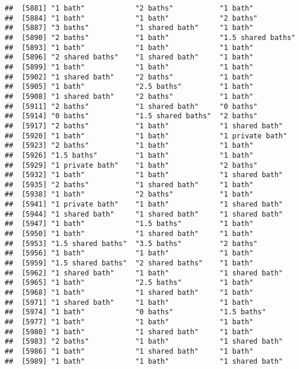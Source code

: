 \documentclass[
]{article}
\begin{document}
\begin{verbatim}
##  [5881] "1 bath"            "2 baths"           "1 bath"           
##  [5884] "1 bath"            "1 bath"            "2 baths"          
##  [5887] "3 baths"           "1 shared bath"     "1 bath"           
##  [5890] "2 baths"           "1 bath"            "1.5 shared baths" 
##  [5893] "1 bath"            "1 bath"            "1 bath"           
##  [5896] "2 shared baths"    "1 shared bath"     "1 bath"           
##  [5899] "1 bath"            "1 bath"            "1 bath"           
##  [5902] "1 shared bath"     "2 baths"           "1 bath"           
##  [5905] "1 bath"            "2.5 baths"         "1 bath"           
##  [5908] "1 shared bath"     "2 baths"           "1 bath"           
##  [5911] "2 baths"           "1 shared bath"     "0 baths"          
##  [5914] "0 baths"           "1.5 shared baths"  "2 baths"          
##  [5917] "2 baths"           "1 bath"            "1 shared bath"    
##  [5920] "1 bath"            "1 bath"            "1 private bath"   
##  [5923] "2 baths"           "1 bath"            "1 bath"           
##  [5926] "1.5 baths"         "1 bath"            "1 bath"           
##  [5929] "1 private bath"    "1 bath"            "2 baths"          
##  [5932] "1 bath"            "1 bath"            "1 shared bath"    
##  [5935] "2 baths"           "1 shared bath"     "1 bath"           
##  [5938] "1 bath"            "2 baths"           "1 bath"           
##  [5941] "1 private bath"    "1 bath"            "1 shared bath"    
##  [5944] "1 shared bath"     "1 shared bath"     "1 shared bath"    
##  [5947] "1 bath"            "1.5 baths"         "1 bath"           
##  [5950] "1 bath"            "1 shared bath"     "1 bath"           
##  [5953] "1.5 shared baths"  "3.5 baths"         "2 baths"          
##  [5956] "1 bath"            "1 bath"            "1 bath"           
##  [5959] "1.5 shared baths"  "2 shared baths"    "1 bath"           
##  [5962] "1 shared bath"     "1 bath"            "1 shared bath"    
##  [5965] "1 bath"            "2.5 baths"         "1 bath"           
##  [5968] "1 bath"            "1 shared bath"     "1 bath"           
##  [5971] "1 shared bath"     "1 bath"            "1 bath"           
##  [5974] "1 bath"            "0 baths"           "1.5 baths"        
##  [5977] "1 bath"            "1 bath"            "1 bath"           
##  [5980] "1 bath"            "1 shared bath"     "1 bath"           
##  [5983] "2 baths"           "1 bath"            "1 shared bath"    
##  [5986] "1 bath"            "1 shared bath"     "1 bath"           
##  [5989] "1 bath"            "1 bath"            "1 shared bath"    

\end{verbatim}
\end{document}
